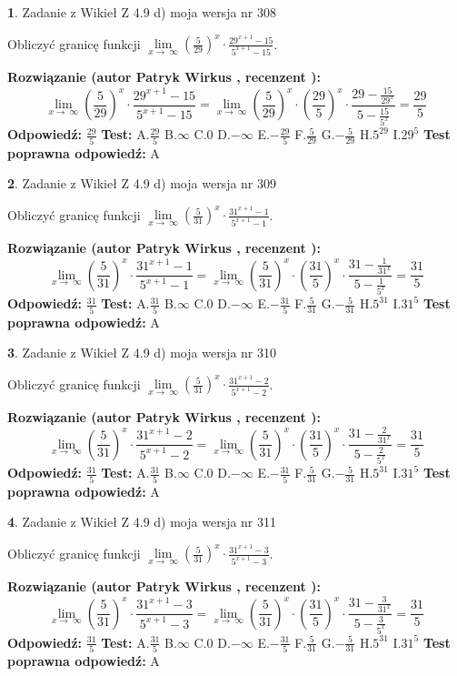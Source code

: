 \documentclass[12pt, a4paper]{article}
\theoremstyle{definition} %
\newtheorem{zad}{}
\newcommand{\zadStart}[1]{\begin{zad}#1\newline}
\newcommand{\zadStop}{\end{zad}}
\newcommand{\rozwStart}[2]{\noindent \textbf{Rozwiązanie (autor #1 , recenzent #2): }\newline}
\newcommand{\rozwStop}{\newline}
\newcommand{\odpStart}{\noindent \textbf{Odpowiedź:}\newline}
\newcommand{\odpStop}{\newline}
\newcommand{\testStart}{\noindent \textbf{Test:}\newline}
\newcommand{\testStop}{\newline}
\newcommand{\kluczStart}{\noindent \textbf{Test poprawna odpowiedź:}\newline}
\newcommand{\kluczStop}{\newline}
\begin{document}
\zadStart{Zadanie z Wikieł Z 4.9 d) moja wersja nr 308}


Obliczyć granicę funkcji  $\lim\limits_{x\to\ \infty}(\frac{5}{29})^{x}\cdot\frac{29^{x+1}-15}{5^{x+1}-15}$.
\zadStop
\rozwStart{Patryk Wirkus}{}
$$\lim\limits_{x\to\ \infty}(\frac{5}{29})^{x}\cdot\frac{29^{x+1}-15}{5^{x+1}-15}=\lim\limits_{x\to\ \infty}(\frac{5}{29})^{x}\cdot(\frac{29}{5})^{x} \cdot \frac{29-\frac{15}{29^{x}}}{5-\frac{15}{5^{x}}} = \frac{29}{5}$$
\rozwStop
\odpStart
$\frac{29}{5}$
\odpStop
\testStart
A.$\frac{29}{5}$ B.$\infty$ C.$0$ D.$-\infty$ E.$-\frac{29}{5}$
F.$\frac{5}{29}$ G.$-\frac{5}{29}$
H.$5^{29}$
I.$29^{5}$
\testStop
\kluczStart
A
\kluczStop



\zadStart{Zadanie z Wikieł Z 4.9 d) moja wersja nr 309}


Obliczyć granicę funkcji  $\lim\limits_{x\to\ \infty}(\frac{5}{31})^{x}\cdot\frac{31^{x+1}-1}{5^{x+1}-1}$.
\zadStop
\rozwStart{Patryk Wirkus}{}
$$\lim\limits_{x\to\ \infty}(\frac{5}{31})^{x}\cdot\frac{31^{x+1}-1}{5^{x+1}-1}=\lim\limits_{x\to\ \infty}(\frac{5}{31})^{x}\cdot(\frac{31}{5})^{x} \cdot \frac{31-\frac{1}{31^{x}}}{5-\frac{1}{5^{x}}} = \frac{31}{5}$$
\rozwStop
\odpStart
$\frac{31}{5}$
\odpStop
\testStart
A.$\frac{31}{5}$ B.$\infty$ C.$0$ D.$-\infty$ E.$-\frac{31}{5}$
F.$\frac{5}{31}$ G.$-\frac{5}{31}$
H.$5^{31}$
I.$31^{5}$
\testStop
\kluczStart
A
\kluczStop



\zadStart{Zadanie z Wikieł Z 4.9 d) moja wersja nr 310}


Obliczyć granicę funkcji  $\lim\limits_{x\to\ \infty}(\frac{5}{31})^{x}\cdot\frac{31^{x+1}-2}{5^{x+1}-2}$.
\zadStop
\rozwStart{Patryk Wirkus}{}
$$\lim\limits_{x\to\ \infty}(\frac{5}{31})^{x}\cdot\frac{31^{x+1}-2}{5^{x+1}-2}=\lim\limits_{x\to\ \infty}(\frac{5}{31})^{x}\cdot(\frac{31}{5})^{x} \cdot \frac{31-\frac{2}{31^{x}}}{5-\frac{2}{5^{x}}} = \frac{31}{5}$$
\rozwStop
\odpStart
$\frac{31}{5}$
\odpStop
\testStart
A.$\frac{31}{5}$ B.$\infty$ C.$0$ D.$-\infty$ E.$-\frac{31}{5}$
F.$\frac{5}{31}$ G.$-\frac{5}{31}$
H.$5^{31}$
I.$31^{5}$
\testStop
\kluczStart
A
\kluczStop



\zadStart{Zadanie z Wikieł Z 4.9 d) moja wersja nr 311}


Obliczyć granicę funkcji  $\lim\limits_{x\to\ \infty}(\frac{5}{31})^{x}\cdot\frac{31^{x+1}-3}{5^{x+1}-3}$.
\zadStop
\rozwStart{Patryk Wirkus}{}
$$\lim\limits_{x\to\ \infty}(\frac{5}{31})^{x}\cdot\frac{31^{x+1}-3}{5^{x+1}-3}=\lim\limits_{x\to\ \infty}(\frac{5}{31})^{x}\cdot(\frac{31}{5})^{x} \cdot \frac{31-\frac{3}{31^{x}}}{5-\frac{3}{5^{x}}} = \frac{31}{5}$$
\rozwStop
\odpStart
$\frac{31}{5}$
\odpStop
\testStart
A.$\frac{31}{5}$ B.$\infty$ C.$0$ D.$-\infty$ E.$-\frac{31}{5}$
F.$\frac{5}{31}$ G.$-\frac{5}{31}$
H.$5^{31}$
I.$31^{5}$
\testStop
\kluczStart
A
\kluczStop
\end{document}
